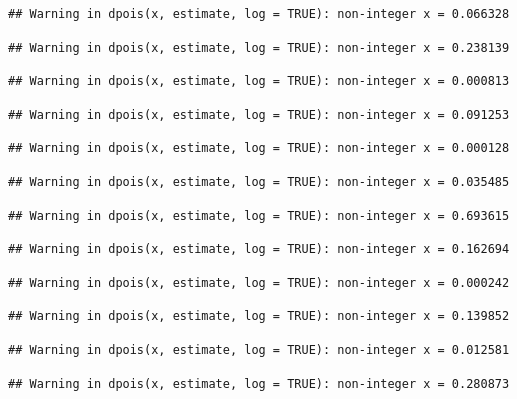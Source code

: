 \documentclass[]{article}
\begin{document}
\begin{verbatim}
## Warning in dpois(x, estimate, log = TRUE): non-integer x = 0.066328
\end{verbatim}

\begin{verbatim}
## Warning in dpois(x, estimate, log = TRUE): non-integer x = 0.238139
\end{verbatim}

\begin{verbatim}
## Warning in dpois(x, estimate, log = TRUE): non-integer x = 0.000813
\end{verbatim}

\begin{verbatim}
## Warning in dpois(x, estimate, log = TRUE): non-integer x = 0.091253
\end{verbatim}

\begin{verbatim}
## Warning in dpois(x, estimate, log = TRUE): non-integer x = 0.000128
\end{verbatim}

\begin{verbatim}
## Warning in dpois(x, estimate, log = TRUE): non-integer x = 0.035485
\end{verbatim}

\begin{verbatim}
## Warning in dpois(x, estimate, log = TRUE): non-integer x = 0.693615
\end{verbatim}

\begin{verbatim}
## Warning in dpois(x, estimate, log = TRUE): non-integer x = 0.162694
\end{verbatim}

\begin{verbatim}
## Warning in dpois(x, estimate, log = TRUE): non-integer x = 0.000242
\end{verbatim}

\begin{verbatim}
## Warning in dpois(x, estimate, log = TRUE): non-integer x = 0.139852
\end{verbatim}

\begin{verbatim}
## Warning in dpois(x, estimate, log = TRUE): non-integer x = 0.012581
\end{verbatim}

\begin{verbatim}
## Warning in dpois(x, estimate, log = TRUE): non-integer x = 0.280873
\end{verbatim}
\end{document}
